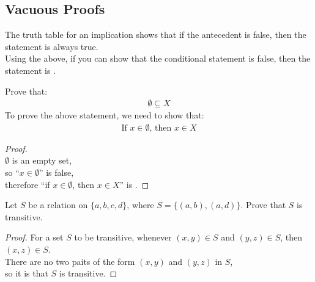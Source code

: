 \documentclass[../notes.tex]{subfiles}
\begin{document}
			\subsection{Vacuous Proofs}
				The truth table for an implication shows that if the antecedent is false, then the statement is always true.\\
				Using the above, if you can show that the conditional statement is false, then the statement is .
				\begin{example}[width=0.7\textwidth]
					Prove that:
					\begin{align*}
						\emptyset \subseteq X
					\end{align*}
					To prove the above statement, we need to show that:
						\begin{align*}
							\text{If } x \in \emptyset \text{, then } x \in X
						\end{align*}
					\begin{proof}
						$ $\\
						$\emptyset$ is an empty set,\\
						so ``$x \in \emptyset$'' is false,\\
						therefore ``if $x \in \emptyset$, then $x \in X$'' is .
					\end{proof}
				\end{example}
				\begin{example}
					Let $S$ be a relation on $\{a, b, c, d\}$, where $S = \bigl\{(a, b), (a, d)\bigr\}$. Prove that $S$ is transitive.
					\begin{proof} For a set $S$ to be transitive, whenever $(x, y) \in S$ and $(y, z) \in S$, then $(x, z) \in S$.\\
						There are no two paits of the form $(x, y)$ and $(y, z)$ in $S$,\\
						so it is  that $S$ is transitive.
					\end{proof}
				\end{example}
\end{document}
